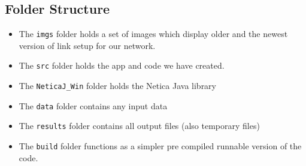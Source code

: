 \documentclass[12pt]{scrartcl}
\begin{document}
\subsection{Folder Structure}
\begin{itemize}
    \item The \texttt{imgs} folder holds a set of images which display older and the newest version of link setup for our network.
    \item The \texttt{src} folder holds the app and code we have created.
    \item The \texttt{NeticaJ_Win} folder holds the Netica Java library
    \item The \texttt{data} folder contains any input data
    \item The \texttt{results} folder contains all output files (also temporary files)
    \item The \texttt{build} folder functions as a simpler pre compiled runnable version of the code.
\end{itemize}
\end{document}
